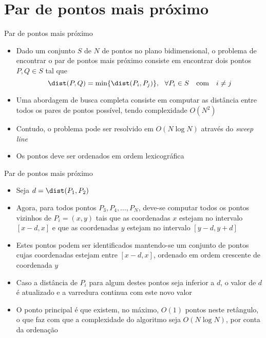 \section{Par de pontos mais próximo}

\begin{frame}[fragile]{Par de pontos mais próximo}

    \begin{itemize}
        \item Dado um conjunto $S$ de $N$ de pontos no plano bidimensional, o problema de 
            encontrar o par de pontos mais próximo consiste em encontrar dois pontos $P, Q\in S$
            tal que
            \[
                \dist(P, Q) = \min\lbrace \dist(P_i, P_j)\rbrace,\ \ \forall P_i\in S\ \ \ \mbox{com}\ \ \ i \neq j
            \]

        \item Uma abordagem de busca completa consiste em computar as distância entre todos
            os pares de pontos possível, tendo complexidade $O(N^2)$

        \item Contudo, o problema pode ser resolvido em $O(N\log N)$ através do \textit{sweep line}

        \item Os pontos deve ser ordenados em ordem lexicográfica
    \end{itemize}

\end{frame}

\begin{frame}[fragile]{Par de pontos mais próximo}

    \begin{itemize}
 
        \item Seja $d = \dist(P_1, P_2)$
 
        \item Agora, para todos pontos $P_3, P_4, \ldots, P_N$, deve-se computar todos os pontos
            vizinhos de $P_i = (x, y)$ tais que as coordenadas $x$ estejam no intervalo
            $[x - d, x]$ e que as coordenadas $y$ estejam no intervalo $[y - d, y + d]$

        \item Estes pontos podem ser identificados mantendo-se um conjunto de pontos cujas 
            coordenadas estejam entre $[x - d, x]$, ordenado em ordem crescente de coordenada
            $y$

        \item Caso a distância de $P_i$ para algum destes pontos seja inferior a $d$, o valor de
            $d$ é atualizado e a varredura continua com este novo valor

        \item O ponto principal é que existem, no máximo, $O(1)$ pontos neste retângulo, o que
            faz com que a complexidade do algoritmo seja $O(N\log N)$, por conta da ordenação

    \end{itemize}

\end{frame}

